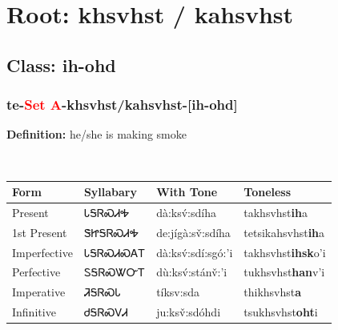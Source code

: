 \needspace{4in}
\section*{Root: khsvhst / kahsvhst}
\nopagebreak
{}
\needspace{3in}
\subsection*{Class: ih-ohd}
\nopagebreak
\needspace{2in}
\subsubsection*{te{-}\textcolor{Red}{Set A}{-}\textbf{khsvhst/kahsvhst}{-}[ih-ohd]}
\nopagebreak
\textbf{Definition: } he/she is making smoke
\\[0.5em]
\begin{tabularx}{\textwidth}{l X X X}%
\toprule%
\textbf{Form}&\textbf{Syllabary}&\textbf{With Tone}&\textbf{Toneless}\\%
\midrule%
Present&ᏓᎦᏒᏍᏗᎭ&dà:ksv́:sdíha&takhsvhst\textbf{ih}a\\%
1st Present&ᏕᏥᎦᏒᏍᏗᎭ&de:jígà:sv̌:sdíha&tetsikahsvhst\textbf{ih}a\\%
Imperfective&ᏓᎦᏒᏍᏗᏍᎪᎢ&dà:ksv́:sdí:sgó:’i&takhsvhst\textbf{ihsk}o'i\\%
Perfective&ᏚᎦᏒᏍᏔᏅᎢ&dù:ksv́:stánv̌:’i&tukhsvhst\textbf{han}v'i\\%
Imperative&ᏘᎦᏒᏍᏓ&tíksv:sda&thikhsvhst\textbf{a}\\%
Infinitive&ᏧᎦᏒᏍᏙᏗ&ju:ksv̌:sdóhdi&tsukhsvhst\textbf{oht}i\\%
\bottomrule%
\end{tabularx}
\\[1em]